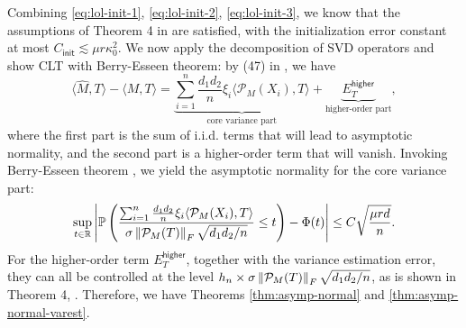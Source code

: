 \documentclass[12pt]{article}
\newcommand{\tF}{{\rm F}}
\newcommand{\abs}[1]{\left\lvert#1\right\rvert}
\newcommand{\norm}[1]{\left\lVert#1\right\rVert}
\newcommand{\PP}{\mathbb{P}}
\newcommand{\R}{\mathbb{R}}
\newcommand{\cP}{\mathcal{P}}
\def\PP{{\mathbb P}}
\newcommand{\init}{{\mathsf{init}}}
\newcommand{\higher}{ {\mathsf{higher}} }
\theoremstyle{plain}
\begin{document}
Combining \eqref{eq:lol-init-1}, \eqref{eq:lol-init-2}, \eqref{eq:lol-init-3}, we know that the assumptions of Theorem 4 in \cite{ma2024statistical} are satisfied, with the initialization error constant at most $C_{\init}\lesssim \mu r\kappa_0^2$.  We now apply the decomposition of SVD operators \citep{xia2021statistical,ma2024statistical} and show CLT with Berry-Esseen theorem: by (47) in \cite{ma2024statistical}, we have
\begin{equation}\label{eq:svd-decomp}
    \langle \widehat{M},T\rangle -  \langle M,T\rangle = \underbrace{\sum_{i=1}^n \frac{d_1 d_2}{n}\xi_i\langle \cP_M( X_i),T\rangle}_{\text{core variance part}} + \underbrace{E_T^{\higher}}_{\text{higher-order part}},
\end{equation}
where the first part is the sum of i.i.d. terms that will lead to asymptotic normality, and the second part is a higher-order term that will vanish. Invoking Berry-Esseen theorem \citep{raivc2019multivariate}, we yield the asymptotic normality for the core variance part:
\begin{equation}\label{eq:BE-core}
    \sup_{t\in\R}\abs{\PP\left( \frac{\sum_{i=1}^n \frac{d_1 d_2}{n}\xi_i\langle \cP_M( X_i),T\rangle}{ \sigma \norm{\cP_M(T)}_{\tF} \sqrt{d_1 d_2/n}}\le t  \right) - \Phi(t)}\le C\sqrt{\frac{\mu r d}{n}}.
\end{equation}
For the higher-order term $E_T^{\higher}$, together with the variance estimation error, they can all be controlled at the level $h_n\times \sigma \norm{\cP_M(T)}_{\tF} \sqrt{d_1 d_2/n}$,  as is shown in Theorem 4, \cite{ma2024statistical}.
Therefore, we have Theorems \ref{thm:asymp-normal} and \ref{thm:asymp-normal-varest}.
\end{document}
